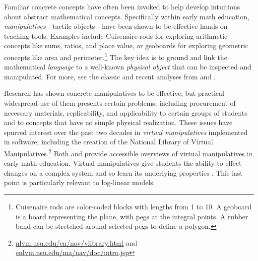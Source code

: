 \documentclass[11pt,letterpaper]{article}
\newcommand{\Note}[1]{}
\newcommand{\NoteSigned}[3]{{\sethlcolor{#2}\Note{#1: #3}}}
\newcommand{\NoteFF}[1]{\NoteSigned{FF}{LightBlue}{#1}}
\newcommand{\NoteJE}[1]{\NoteSigned{JE}{LightGreen}{#1}}
\begin{document}
Familiar concrete concepts have often been invoked to help develop
intuitions about abstract mathematical concepts.  Specifically within
early math education, \textit{manipulatives}---tactile objects---have
been shown to be effective hands-on teaching tools. Examples include
Cuisenaire rods for exploring arithmetic concepts like sums, ratios,
and place value, or geoboards for exploring geometric concepts like
area and perimeter.\footnote{Cuisenaire rods are color-coded blocks
  with lengths from 1 to 10.  A geoboard is a board representing the
  plane, with pegs at the integral points.  A rubber band can be
  stretched around selected pegs to define a polygon.} The key idea is
to ground and link the mathematical \textit{language} to a well-known
\textit{physical object} that can be inspected and manipulated.  For
more, see the classic and recent analyses from
 and .

Research has shown concrete manipulatives to be effective, but practical widespread use of them presents certain 
problems, including procurement of necessary materials, replicability,
and applicability to certain groups of students and to concepts
that have no simple physical realization. These issues
have spurred interest over the past two decades in
\textit{virtual manipulatives} implemented in software, including the creation of 
the National Library of Virtual Manipulatives.\footnote{\url{nlvm.usu.edu/en/nav/vlibrary.html} and 
\url{enlvm.usu.edu/ma/nav/doc/intro.jsp}} 
Both  and  provide accessible overviews of 
virtual manipulatives in early math education. 
Virtual manipulatives give students the ability to effect changes on a
complex system and so learn its underlying 
properties \cite{moyer2002virtual}. This last point is particularly
relevant to log-linear models.

\end{document}
